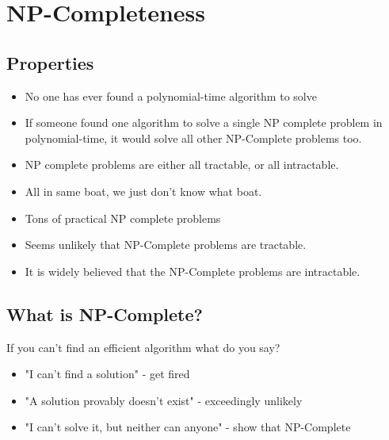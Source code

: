 \documentclass[12pt, letter]{article}
\begin{document}
\section{NP-Completeness}%
\label{sec:np_completeness}

\subsection*{Properties}
\begin{itemize}
	\item No one has ever found a polynomial-time algorithm to solve
	\item If someone found one algorithm to solve a single NP complete problem in polynomial-time, it would solve all other NP-Complete problems too.
\end{itemize}

\begin{itemize}
	\item NP complete problems are either all tractable, or all intractable.
	\item All in same boat, we just don't know what boat.
	\item Tons of practical NP complete problems
	\item Seems unlikely that NP-Complete problems are tractable.
	\item It is widely believed that the NP-Complete problems are intractable.
\end{itemize}

\subsection*{What is NP-Complete?}
If you can't find an efficient algorithm what do you say?
\begin{itemize}
	\item "I can't find a solution" - get fired
	\item "A solution provably doesn't exist" - exceedingly unlikely
	\item "I can't solve it, but neither can anyone" - show that NP-Complete
\end{itemize}
\end{document}
